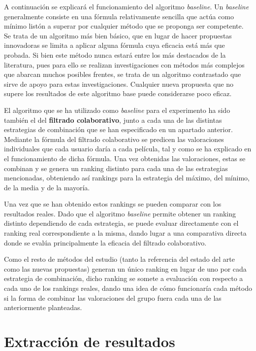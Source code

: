 A continuación se explicará el funcionamiento del algoritmo \textit{baseline}. Un \textit{baseline} generalmente consiste en una fórmula relativamente sencilla que actúa como mínimo listón a superar por cualquier método que se proponga ser competente. Se trata de un algoritmo más bien básico, que en lugar de hacer propuestas innovadoras se limita a aplicar alguna fórmula cuya eficacia está más que probada. Si bien este método nunca estará entre los más destacados de la literatura, pues para ello se realizan investigaciones con métodos más complejos que abarcan muchos posibles frentes, se trata de un algoritmo contrastado que sirve de apoyo para estas investigaciones. Cualquier nueva propuesta que no supere los resultados de este algoritmo base puede considerarse poco eficaz.

El algoritmo que se ha utilizado como \textit{baseline} para el experimento ha sido también el del \textbf{filtrado colaborativo}, junto a cada una de las distintas estrategias de combinación que se han especificado en un apartado anterior. Mediante la fórmula del filtrado colaborativo se predicen las valoraciones individuales que cada usuario daría a cada película, tal y como se ha explicado en el funcionamiento de dicha fórmula. Una vez obtenidas las valoraciones, estas se combinan y se genera un ranking distinto para cada una de las estrategias mencionadas, obteniendo así rankings para la estrategia del máximo, del mínimo, de la media y de la mayoría.

Una vez que se han obtenido estos rankings se pueden comparar con los resultados reales. Dado que el algoritmo \textit{baseline} permite obtener un ranking distinto dependiendo de cada estrategia, se puede evaluar directamente con el ranking real correspondiente a la misma, dando lugar a una comparativa directa donde se evalúa principalmente la eficacia del filtrado colaborativo.

Como el resto de métodos del estudio (tanto la referencia del estado del arte como las nuevas propuestas) generan un único ranking en lugar de uno por cada estrategia de combinación, dicho ranking se somete a evaluación con respecto a cada uno de los rankings reales, dando una idea de cómo funcionaría cada método si la forma de combinar las valoraciones del grupo fuera cada una de las anteriormente planteadas.

\section{Extracción de resultados}

